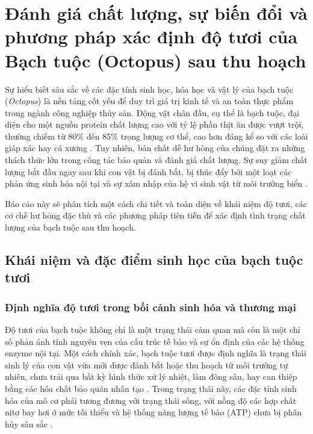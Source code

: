 \documentclass[12pt,a4paper]{report}
\begin{document}
\chapter{Đánh giá chất lượng, sự biến đổi và phương pháp xác định độ tươi của Bạch tuộc (Octopus) sau thu hoạch}

Sự hiểu biết sâu sắc về các đặc tính sinh học, hóa học và vật lý của bạch tuộc (\textit{Octopus}) là nền tảng cốt yếu để duy trì giá trị kinh tế và an toàn thực phẩm trong ngành công nghiệp thủy sản. Động vật chân đầu, cụ thể là bạch tuộc, đại diện cho một nguồn protein chất lượng cao với tỷ lệ phần thịt ăn được vượt trội, thường chiếm từ 80\% đến 85\% trọng lượng cơ thể, cao hơn đáng kể so với các loài giáp xác hay cá xương \cite{pubmed_ice_storage}. Tuy nhiên, bản chất dễ hư hỏng của chúng đặt ra những thách thức lớn trong công tác bảo quản và đánh giá chất lượng. Sự suy giảm chất lượng bắt đầu ngay sau khi con vật bị đánh bắt, bị thúc đẩy bởi một loạt các phản ứng sinh hóa nội tại và sự xâm nhập của hệ vi sinh vật từ môi trường biển \cite{mdpi_fish_spoilage}. 

Báo cáo này sẽ phân tích một cách chi tiết và toàn diện về khái niệm độ tươi, các cơ chế hư hỏng đặc thù và các phương pháp tiên tiến để xác định tình trạng chất lượng của bạch tuộc sau thu hoạch.

\section{Khái niệm và đặc điểm sinh học của bạch tuộc tươi}

\subsection{Định nghĩa độ tươi trong bối cảnh sinh hóa và thương mại}

Độ tươi của bạch tuộc không chỉ là một trạng thái cảm quan mà còn là một chỉ số phản ánh tính nguyên vẹn của cấu trúc tế bào và sự ổn định của các hệ thống enzyme nội tại. Một cách chính xác, bạch tuộc tươi được định nghĩa là trạng thái sinh lý của con vật vừa mới được đánh bắt hoặc thu hoạch từ môi trường tự nhiên, chưa trải qua bất kỳ hình thức xử lý nhiệt, làm đông sâu, hay can thiệp bằng các hóa chất bảo quản nhân tạo \cite{tcvn_7265}. Trong trạng thái này, các đặc tính sinh hóa của mô cơ phải tương đương với trạng thái sống, với nồng độ các hợp chất nitơ bay hơi ở mức tối thiểu và hệ thống năng lượng tế bào (ATP) chưa bị phân hủy sâu sắc \cite{researchgate_squid_freshness}.
\end{document}
